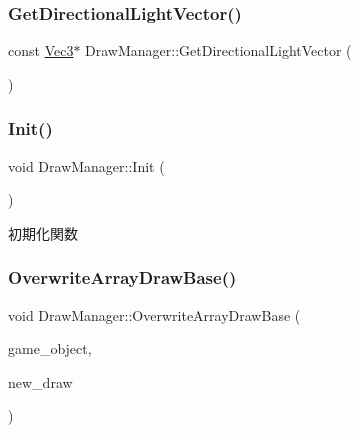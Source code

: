 \mbox{\label{class_draw_manager_a952023ad9e2e12844c93e37029a32700}} 
\subsubsection{\texorpdfstring{Get\+Directional\+Light\+Vector()}{GetDirectionalLightVector()}}
{\footnotesize\ttfamily const \mbox{\hyperlink{_vector3_d_8h_ab16f59e4393f29a01ec8b9bbbabbe65d}{Vec3}}$\ast$ Draw\+Manager\+::\+Get\+Directional\+Light\+Vector (\begin{DoxyParamCaption}{ }\end{DoxyParamCaption})\hspace{0.3cm}{\ttfamily [inline]}}

\mbox{\label{class_draw_manager_a3cb9319d492285bd9dfc983d27e5d04f}} 
\subsubsection{\texorpdfstring{Init()}{Init()}}
{\footnotesize\ttfamily void Draw\+Manager\+::\+Init (\begin{DoxyParamCaption}{ }\end{DoxyParamCaption})}



初期化関数 

\mbox{\label{class_draw_manager_a94ef5a241c8d78187a2a6c0ed3c9efec}} 
\subsubsection{\texorpdfstring{Overwrite\+Array\+Draw\+Base()}{OverwriteArrayDrawBase()}}
{\footnotesize\ttfamily void Draw\+Manager\+::\+Overwrite\+Array\+Draw\+Base (\begin{DoxyParamCaption}\item[{\mbox{\hyperlink{class_game_object_base}{Game\+Object\+Base}} $\ast$}]{game\+\_\+object,  }\item[{\mbox{\hyperlink{class_draw_base}{Draw\+Base}} $\ast$}]{new\+\_\+draw }\end{DoxyParamCaption})}



